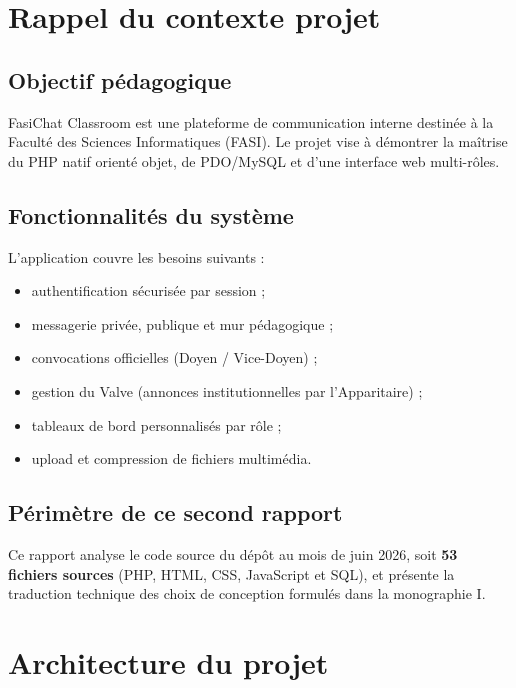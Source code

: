 \documentclass[12pt,a4paper]{article}
\begin{document}
\section{Rappel du contexte projet}

\subsection{Objectif pédagogique}
FasiChat Classroom est une plateforme de communication interne destinée à la Faculté des Sciences Informatiques (FASI). Le projet vise à démontrer la maîtrise du PHP natif orienté objet, de PDO/MySQL et d'une interface web multi-rôles.

\subsection{Fonctionnalités du système}
L'application couvre les besoins suivants :
\begin{itemize}
  \item authentification sécurisée par session ;
  \item messagerie privée, publique et mur pédagogique ;
  \item convocations officielles (Doyen / Vice-Doyen) ;
  \item gestion du Valve (annonces institutionnelles par l'Apparitaire) ;
  \item tableaux de bord personnalisés par rôle ;
  \item upload et compression de fichiers multimédia.
\end{itemize}

\subsection{Périmètre de ce second rapport}
Ce rapport analyse le code source du dépôt au mois de juin 2026, soit \textbf{53 fichiers sources} (PHP, HTML, CSS, JavaScript et SQL), et présente la traduction technique des choix de conception formulés dans la monographie I.

\section{Architecture du projet}
\end{document}
